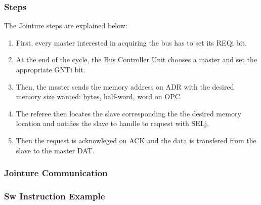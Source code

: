 
\begin{frame}
  \frametitle{Steps}

  The Jointure steps are explained below:

  \begin{enumerate}
    \item
      First, every master interested in acquiring the bus has to set
      its REQi bit.
    \item
      At the end of the cycle, the Bus Controller Unit chooses a master
      and set the appropriate GNTi bit.
    \item
      Then, the master sends the memory address on ADR with the desired
      memory size wanted: bytes, half-word, word on OPC.
    \item
      The referee then locates the slave corresponding the the desired
      memory location and notifies the slave to handle to request with
      SELj.
    \item
      Then the request is acknowleged on ACK and the data is transfered
      from the slave to the master DAT.
  \end{enumerate}
\end{frame}


\begin{frame}
  \frametitle{Jointure Communication}

  \begin{center}
  \end{center}
\end{frame}


\begin{frame}
  \frametitle{\textbf{Sw} Instruction Example}

  \begin{center}
  \end{center}
\end{frame}


